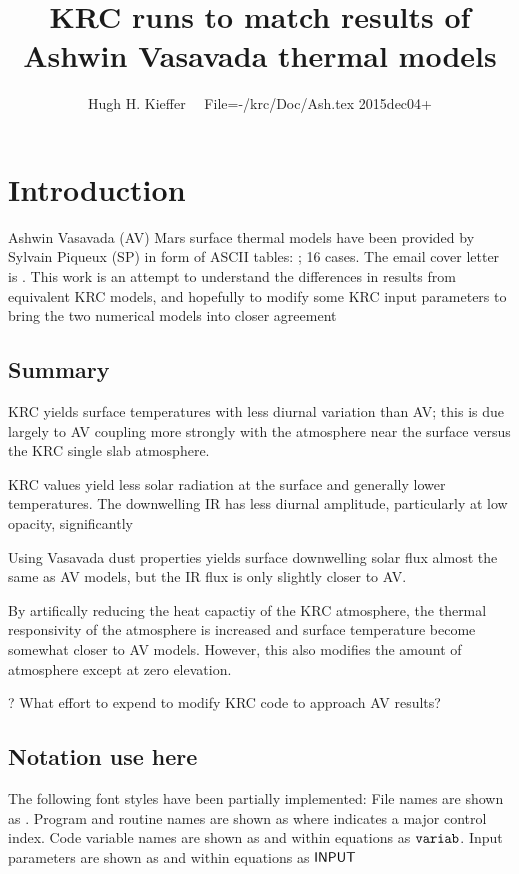 \documentclass{article}
\title{KRC runs to match results of Ashwin Vasavada thermal models}
\author{Hugh H. Kieffer  \ \ File=-/krc/Doc/Ash.tex 2015dec04+}
\begin{document}

\maketitle
\tableofcontents
\listoffigures
\listoftables
\section{Introduction}
Ashwin Vasavada (AV) Mars surface thermal models have been provided by Sylvain Piqueux (SP) in form of ASCII tables: ; 16 cases. The email cover letter is . This work is an attempt to understand the differences in results from equivalent KRC models, and hopefully to modify some KRC input parameters to bring the two numerical models into closer agreement

\subsection{Summary}
KRC yields surface temperatures with less diurnal variation than AV; this is due largely to AV coupling more strongly with the atmosphere near the surface versus the KRC single slab atmosphere. 
   
KRC   values yield less solar radiation at the surface and generally lower temperatures. The downwelling IR has less diurnal amplitude, particularly at low opacity,  significantly   

Using Vasavada dust properties yields surface downwelling solar flux almost the same as AV models, but the IR flux is only slightly closer to AV.

By artifically reducing the heat capactiy of the KRC atmosphere, the thermal responsivity of the atmosphere is increased and surface temperature become somewhat closer to AV models. However, this also modifies the amount of atmosphere except at zero elevation. 

? What effort to expend to modify KRC code to approach AV results?

\subsection{Notation use here}
The following font styles have been partially implemented: 
\qi File names are shown as . 
\qi Program and routine names are shown as  
\qii where  indicates a major control index. 
\qi Code variable names are shown as  and within equations as $\mathtt{v
ariab}$.  
\qi Input parameters are shown as  and within equations as $\mathsf{INPUT
}$
\end{document}
